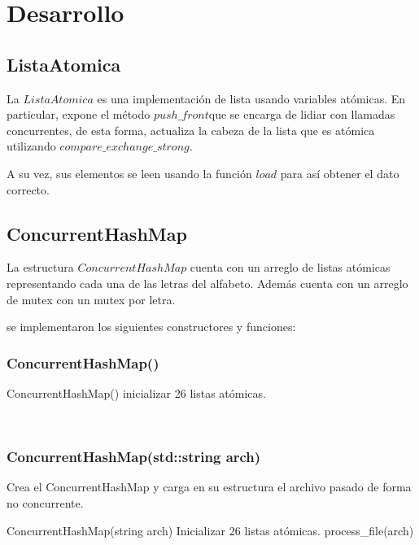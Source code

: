 \section{Desarrollo}

\subsection{ListaAtomica}

La $ListaAtomica$ es una implementación de lista usando variables atómicas. En particular, expone el método $push\_front$que se encarga de lidiar con llamadas concurrentes, de esta forma, actualiza la cabeza de la lista que es atómica utilizando $compare\_exchange\_strong$.

A su vez, sus elementos se leen usando la función $load$ para así obtener el dato correcto.

\subsection{ConcurrentHashMap}

La estructura $ConcurrentHashMap$ cuenta con un arreglo de listas atómicas representando cada una de las letras del alfabeto. Además cuenta con un arreglo de mutex con un mutex por letra. 

se implementaron los siguientes constructores y funciones:\\

\subsubsection{ConcurrentHashMap()}
\begin{codesnippet}
ConcurrentHashMap()
 	inicializar 26 listas atómicas.
\end{codesnippet}\\

\subsubsection{ConcurrentHashMap(std::string arch)}
Crea el ConcurrentHashMap y carga en su estructura el archivo pasado de forma no concurrente.\\
\begin{codesnippet}
ConcurrentHashMap(string arch)
 	Inicializar 26 listas atómicas.
 	process_file(arch)
\end{codesnippet}\\

